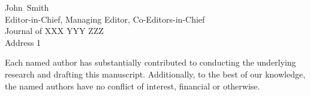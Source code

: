 \documentclass{cover-letter}
\def\EditorFirstName{John}
\def\EditorLastName{Smith}
\def\EditorName{\EditorFirstName~\EditorLastName}
\def\EditorTitle{Editor-in-Chief, Managing Editor, Co-Editors-in-Chief}
\def\JournalName{Journal of XXX YYY ZZZ} %
\def\JournalAddress{Address 1} %
\begin{document}
\begin{letter}{\EditorName \\ \EditorTitle \\ \JournalName \\ \JournalAddress}
%







% 
% 



Each named author has substantially contributed to conducting the underlying research and drafting this manuscript. Additionally, to the best of our knowledge, the named authors have no conflict of interest, financial or otherwise.


\end{letter}
\end{document}
